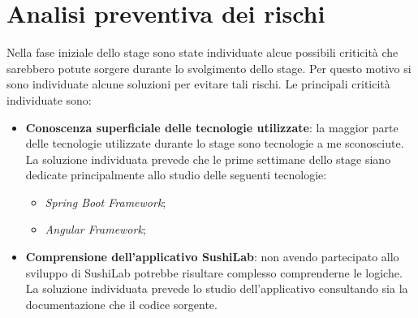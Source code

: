 \section{Analisi preventiva dei rischi}
Nella fase iniziale dello stage sono state individuate alcue possibili criticità che sarebbero potute sorgere durante lo svolgimento dello stage. Per questo motivo si sono individuate alcune soluzioni per evitare tali rischi. Le principali criticità individuate sono:
\begin{itemize}
  \item \textbf{Conoscenza superficiale delle tecnologie utilizzate}: la maggior parte delle tecnologie utilizzate durante lo stage sono tecnologie a me sconosciute. La soluzione individuata prevede che le prime settimane dello stage siano dedicate principalmente allo studio delle seguenti tecnologie:
  \begin{itemize}
    \item \textit{Spring Boot Framework};
    \item \textit{Angular Framework};
  \end{itemize}
  \item \textbf{Comprensione dell'applicativo SushiLab}: non avendo partecipato allo sviluppo di SushiLab potrebbe risultare complesso comprenderne le logiche. La soluzione individuata prevede lo studio dell'applicativo consultando sia la documentazione che il codice sorgente.
\end{itemize}
